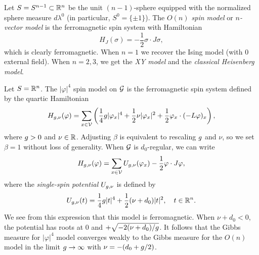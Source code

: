 

\begin{example}
Let $S = S^{n-1} \subset {\mathbb R}^n$ be the unit $(n-1)$-sphere equipped with the
normalized sphere measure $d\lambda^0$ (in particular, $S^0 = \{ \pm 1 \}$).
The \emph{$O(n)$ spin model} or \emph{$n$-vector model} is the ferromagnetic
spin system with Hamiltonian
\begin{equation}
H_J(\sigma) = -\frac{1}{2} \sigma \cdot J \sigma,
\end{equation}
which is clearly ferromagnetic. When $n = 1$ we recover the Ising model (with
$0$ external field). When $n = 2, 3$, we get the \emph{XY model} and the
\emph{classical Heisenberg model}.
\end{example}



\begin{example}
Let $S = {\mathbb R}^n$. The $|\varphi|^4$ spin model on $\mathcal{G}$ is the ferromagnetic spin system
defined by the quartic Hamiltonian
\begin{equation}
\label{e:phi4-Ham}
H_{g,\nu}(\varphi)
  =
\sum_{x\in\mathcal{V}}
\left(
  \frac{1}{4} g |\varphi_x|^4
    +
  \frac{1}{2} \nu |\varphi_x|^2
    +
  \frac{1}{2} \varphi_x \cdot (-L \varphi)_x
\right),
\end{equation}
where $g > 0$ and $\nu\in{\mathbb R}$. Adjusting $\beta$ is equivalent to  rescaling
$g$ and $\nu$, so we set $\beta = 1$ without loss of generality.
When $\mathcal{G}$ is $d_0$-regular, we can write
\begin{equation}
H_{g,\nu}(\varphi)
  =
\sum_{x\in\mathcal{V}} U_{g,\nu}(\varphi_x) - \frac{1}{2} \varphi \cdot J \varphi,
\end{equation}
where the \emph{single-spin potential} $U_{g,\nu}$ is defined by
\begin{equation}
U_{g,\nu}(t)
	=
\frac{1}{4} g |t|^4
	+
\frac{1}{2} (\nu + d_0) |t|^2,
	\quad
t \in {\mathbb R}^n.
\end{equation}
We see from this expression that this model is ferromagnetic.
When $\nu + d_0 < 0$, the potential has roots at $0$ and $+\sqrt{-2 (\nu + d_0) / g}$.
It follows that the Gibbs measure for $|\varphi|^4$ model converges weakly to the
Gibbs measure for the $O(n)$ model in the limit $g\rightarrow\infty$
with $\nu = -(d_0 + g / 2)$.
\end{example}

